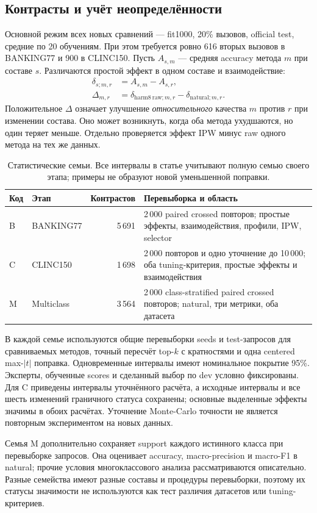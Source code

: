 \subsection{Контрасты и учёт неопределённости}
Основной режим всех новых сравнений --- fit1000, 20\% вызовов,
official test, средние по 20 обучениям. При этом требуется ровно
616 вторых вызовов в BANKING77 и 900 в CLINC150.
Пусть $A_{s,m}$ --- средняя accuracy метода $m$ при составе $s$.
Различаются простой эффект в одном составе и взаимодействие:
\begin{equation}\label{eq:extended_interaction}
\begin{aligned}
\delta_{s;m,r}&=A_{s,m}-A_{s,r},\\
\Delta_{m,r}&=\delta_{\mathrm{harm8\ raw};m,r}
                 -\delta_{\mathrm{natural};m,r}.
\end{aligned}
\end{equation}
Положительное $\Delta$ означает улучшение \emph{относительного}
качества $m$ против $r$ при изменении состава. Оно может возникнуть,
когда оба метода ухудшаются, но один теряет меньше. Отдельно
проверяется эффект IPW минус raw одного метода на тех же данных.

\begin{table}[htbp]\centering\small
\caption{Статистические семьи. Все интервалы в статье учитывают полную
семью своего этапа; примеры не образуют новой уменьшенной поправки.}
\label{tab:families}
\begin{tabular}{llrp{.37\linewidth}}
\toprule
Код & Этап & Контрастов & Перевыборка и область \\
\midrule
B & BANKING77 & 5\,691 & 2\,000 paired crossed повторов;
простые эффекты, взаимодействия, профили, IPW, selector \\
C & CLINC150 & 1\,698 & 2\,000 повторов и одно уточнение до
10\,000; оба tuning-критерия, простые эффекты и взаимодействия \\
M & Multiclass & 3\,564 & 2\,000 class-stratified paired crossed
повторов; natural, три метрики, оба датасета \\
\bottomrule
\end{tabular}
\end{table}

В каждой семье используются общие перевыборки seeds и test-запросов
для сравниваемых методов, точный пересчёт top-$k$ с кратностями
и одна centered max-$|t|$ поправка. Одновременные интервалы имеют
номинальное покрытие 95\%. Эксперты, обученные scores и сделанный
выбор по dev условно фиксированы. Для C приведены интервалы
уточнённого расчёта, а исходные интервалы и все шесть изменений
граничного статуса сохранены; основные выделенные эффекты значимы
в обоих расчётах. Уточнение Monte-Carlo точности не является
повторным экспериментом на новых данных.

Семья M дополнительно сохраняет support каждого истинного класса
при перевыборке запросов. Она оценивает accuracy, macro-precision
и macro-F1 в natural; прочие условия многоклассового анализа
рассматриваются описательно. Разные семейства имеют разные составы
и процедуры перевыборки, поэтому их статусы значимости не используются
как тест различия датасетов или tuning-критериев.
